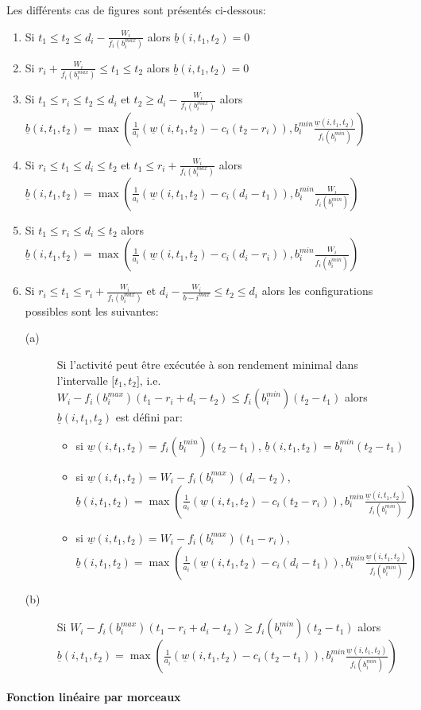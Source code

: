 \documentclass{report}
\newcommand{\bb}{\underline{b}(i,t_1,t_2)}
\newcommand{\wb}{\underline{w}(i,t_1,t_2)}
\begin{document}
Les différents cas de figures sont présentés ci-dessous:
\begin{enumerate}
\item Si $t_1 \le t_2 \le d_i - \frac{W_i}{f_i(b_i^{max})}$ alors $\bb=0$
\item Si $r_i+\frac{W_i}{f_i(b_i^{max})} \le t_1 \le t_2$ alors $\bb=0$
\item Si $t_1 \le r_i \le t_2 \le d_i$ et $t_2 \ge d_i - \frac{W_i}{f_i(b_i^{max})}$ alors $\bb=\max (\frac{1}{a_i}(\wb-c_i(t_2-r_i)),b_i^{min}\frac{\wb}{f_i(b_i^{min})})$
\item Si $r_i \le t_1 \le d_i \le t_2$ et $t_1 \le r_i+ \frac{W_i}{f_i(b_i^{max})}$ alors $\bb= \max (\frac{1}{a_i} (\wb-c_i(d_i-t_1)),b_i^{min}\frac{W_i}{f_i(b_i^{min})})$
\item Si $t_1 \le r_i \le d_i \le t_2$ alors $\bb= \max (\frac{1}{a_i} (\wb-c_i(d_i-r_i)),b_i^{min}\frac{W_i}{f_i(b_i^{min})})$
\item Si $r_i \le t_1 \le r_i + \frac{W_i}{f_i(b_i^{max})}$ et $d_i-\frac{W_i}{b-i^{max}} \le t_2 \le d_i$ alors les configurations possibles sont les suivantes:
	
  \begin{description}
  \item[(a)] Si l'activité peut être exécutée à son rendement minimal dans l'intervalle ${[}t_1,t_2{]}$, i.e. $W_i -f_i(b_i^{max})(t_1-r_i+d_i-t_2) \le f_i(b_i^{min})(t_2-t_1)$ alors $\bb$ est défini par:
    
    \begin{itemize}
    \item si $\wb=f_i(b_i^{min})(t_2-t_1)$, $\bb=b_i^{min}(t_2-t_1)$
    \item si $\wb=W_i - f_i(b_i^{max})(d_i-t_2)$, $\bb=\max (\frac{1}{a_i} (\wb-c_i(t_2-r_i)),b_i^{min}\frac{\wb}{f_i(b_i^{min})})$
    \item si $\wb=W_i - f_i(b_i^{max})(t_1-r_i)$, $\bb=\max (\frac{1}{a_i} (\wb-c_i(d_i-t_1)),b_i^{min}\frac{\wb}{f_i(b_i^{min})})$
    \end{itemize}
		
  \item[(b)] Si $W_i -f_i(b_i^{max})(t_1-r_i+d_i-t_2) \ge f_i(b_i^{min})(t_2-t_1)$ alors $\bb= \max (\frac{1}{a_i} (\wb-c_i(t_2-t_1)),b_i^{min}\frac{\wb}{f_i(b_i^{min})})$
  \end{description}
\end{enumerate}
	
	
\paragraph{Fonction linéaire par morceaux}
	
\end{document}
